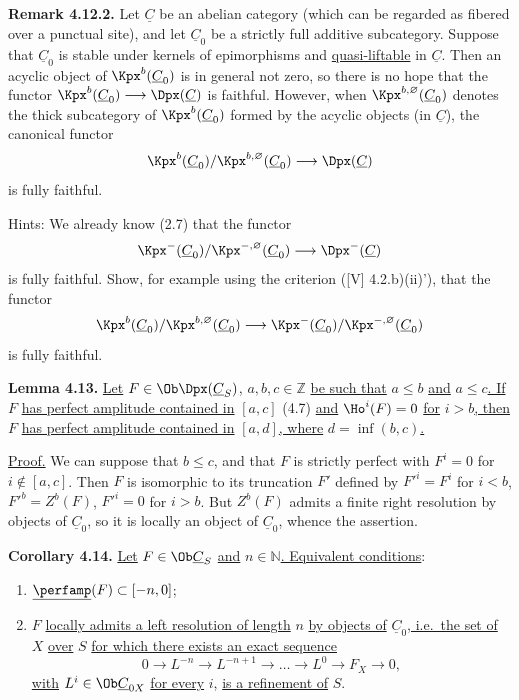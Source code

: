 %
\textbf{Remark 4.12.2.} Let \(\underline{C}\) be an abelian category (which can be regarded as fibered over a punctual site), and let \(\underline{C}_0\) be a strictly full additive subcategory. Suppose that \(\underline{C}_0\) is stable under kernels of epimorphisms and \uline{quasi-liftable} in \(\underline{C}\). Then an acyclic object of \(\Kpx^b(\underline{C}_0)\) is in general not zero, so there is no hope that the functor
\(\Kpx^b(\underline{C}_0)\longrightarrow \Dpx(\underline{C})\)
is faithful. However, when \(\Kpx^{b,\varnothing}(\underline{C}_0)\) denotes the thick subcategory of \(\Kpx^b(\underline{C}_0)\) formed by the acyclic objects (in \(\underline{C}\)), the canonical functor
\[
  \Kpx^b(\underline{C}_0)/\Kpx^{b,\varnothing}(\underline{C}_0)
  \longrightarrow \Dpx(\underline{C})
\]
is fully faithful.

Hints: We already know (2.7) that the functor
\[
  \Kpx^-(\underline{C}_0)/\Kpx^{-,\varnothing}(\underline{C}_0)
  \longrightarrow \Dpx^-(\underline{C})
\]
is fully faithful. Show, for example using the criterion ([V] 4.2.b)(ii)'), that the functor
\[
  \Kpx^b(\underline{C}_0)/\Kpx^{b,\varnothing}(\underline{C}_0)
  \longrightarrow
  \Kpx^-(\underline{C}_0)/\Kpx^{-,\varnothing}(\underline{C}_0)
\]
is fully faithful.

\textbf{Lemma 4.13.} \uline{Let} \(F\in\Ob\Dpx(\underline{C}_S)\)\uline{,} \(a,b,c\in\mathbb Z\) \uline{be such that} \(a\leq b\) \uline{and} \(a\leq c\)\uline{. If} \(F\) \uline{has perfect amplitude contained in} \([a,c]\) (4.7) \uline{and} \(\Ho^i(F)=0\) \uline{for} \(i>b\)\uline{, then} \(F\) \uline{has perfect amplitude contained in} \([a,d]\)\uline{, where} \(d=\inf(b,c)\)\uline{.}

\uline{Proof.} We can suppose that \(b\leq c\), and that \(F\) is strictly perfect with \(F^i=0\) for \(i\notin[a,c]\). Then \(F\) is isomorphic to its truncation \(F'\) defined by
%
\(F'^i=F^i\) for \(i<b\), \(F'^b=Z^b(F)\), \(F'^i=0\) for \(i>b\). But \(Z^b(F)\) admits a finite right resolution by objects of \(\underline{C}_0\), so it is locally an object of \(\underline{C}_0\), whence the assertion.

\textbf{Corollary 4.14.} \uline{Let} \(F\in\Ob\underline{C}_S\) \uline{and} \(n\in\mathbb N\)\uline{. Equivalent conditions}:
\begin{enumerate}[label=(\roman*)]
\item \(\underline{\perfamp}(F)\subset[-n,0]\);
\item \(F\) \uline{locally admits a left resolution of length} \(n\) \uline{by objects of} \(\underline{C}_0\)\uline{, i.e.\ the set of} \(X\) \uline{over} \(S\) \uline{for which there exists an exact sequence}
\[
  0\longrightarrow L^{-n}\longrightarrow L^{-n+1}\longrightarrow \ldots
  \longrightarrow L^0\longrightarrow F_X\longrightarrow 0,
\]
\uline{with} \(L^i\in\Ob\underline{C}_{0X}\) \uline{for every} \(i\), \uline{is a refinement of} \(S\).
\end{enumerate}

